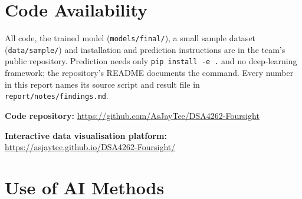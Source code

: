 \documentclass[11pt,a4paper]{article}
\begin{document}
\section*{Code Availability}

All code, the trained model (\texttt{models/final/}), a small sample dataset
(\texttt{data/sample/}) and installation and prediction instructions are in
the team's public repository. Prediction needs only \texttt{pip install -e .}
and no deep-learning framework; the repository's README documents the
command. Every number in this report names its source script and result file
in \texttt{report/notes/findings.md}.

\noindent\textbf{Code repository:} \url{https://github.com/AsJayTee/DSA4262-Foursight}

\noindent\textbf{Interactive data visualisation platform:}\\ \url{https://asjaytee.github.io/DSA4262-Foursight/}
\section*{Use of AI Methods}
\end{document}
